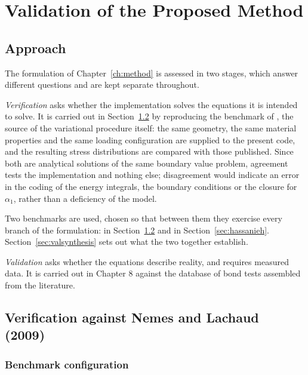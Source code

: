 \chapter{Validation of the Proposed Method}
\label{ch:validation}
 
\section{Approach}
\label{sec:valapproach}
 
The formulation of Chapter~\ref{ch:method} is assessed in two stages, which
answer different questions and are kept separate throughout.
 
\emph{Verification} asks whether the implementation solves the equations it is
intended to solve. It is carried out in Section~\ref{sec:nemes} by reproducing
the benchmark of \textcite{nemesModelingCylindricalAdhesively2009}, the source
of the variational procedure itself: the same geometry, the same material
properties and the same loading configuration are supplied to the present code,
and the resulting stress distributions are compared with those published. Since
both are analytical solutions of the same boundary value problem, agreement
tests the implementation and nothing else; disagreement would indicate an error
in the coding of the energy integrals, the boundary conditions or the closure
for $\alpha_1$, rather than a deficiency of the model.
 
Two benchmarks are used, chosen so that between them they exercise every
branch of the formulation: \textcite{nemesModelingCylindricalAdhesively2009}
in Section~\ref{sec:nemes} and \textcite{hassaniehGluedinrodTimberJoints2018} in
Section~\ref{sec:hassanieh}. Section~\ref{sec:valsynthesis} sets out what the
two together establish.
 
\emph{Validation} asks whether the equations describe reality, and requires
measured data. It is carried out in Chapter 8 against the database of bond
tests assembled from the literature.
 
\newpage
\section[Verification against Nemes and Lachaud (2009)]{Verification against Nemes and Lachaud\\(2009)}
\label{sec:nemes}
 
\subsection{Benchmark configuration}
\label{sec:nemescase}
 
